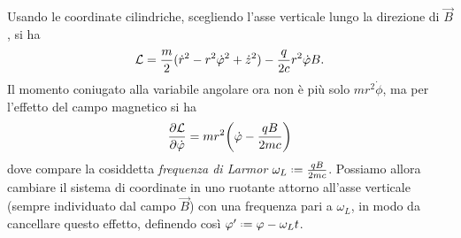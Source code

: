 Usando le coordinate cilindriche, scegliendo l'asse verticale lungo la direzione di $\vec B$, si ha
\begin{equation}
	\mathcal L=\frac{m}2(\dot{r}^2-r^2\dot{\varphi}^2+\dot{z}^2)-\frac{q}{2c}r^2\dot{\varphi}B.
\end{equation}
Il momento coniugato alla variabile angolare ora non è più solo $mr^2\dot{\phi}$, ma per l'effetto del campo magnetico si ha
\begin{equation}
	\frac{\partial {\mathcal L}}{\partial {\dot{\varphi}}}=mr^2\bigg(\dot{\varphi}-\frac{qB}{2mc}\bigg)
\end{equation}
dove compare la cosiddetta \emph{frequenza di Larmor} $\omega_L\defeq\frac{qB}{2mc}$.
Possiamo allora cambiare il sistema di coordinate in uno ruotante attorno all'asse verticale (sempre individuato dal campo $\vec B$) con una frequenza pari a $\omega_L$, in modo da cancellare questo effetto, definendo cos\`i $\phi'\defeq \phi-\omega_Lt$.


